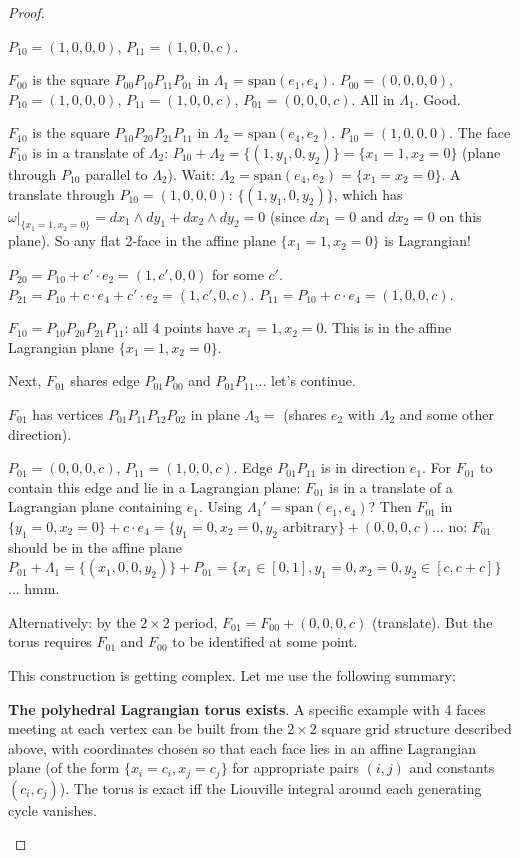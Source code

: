 \documentclass[12pt]{article}
\theoremstyle{definition}
\begin{document}
\begin{proof}
\begin{itemize}
$P_{10} = (1,0,0,0)$, $P_{11} = (1,0,0,c)$.

$F_{00}$ is the square $P_{00}P_{10}P_{11}P_{01}$ in $\Lambda_1 = \mathrm{span}(e_1,e_4)$.
$P_{00} = (0,0,0,0)$, $P_{10} = (1,0,0,0)$, $P_{11} = (1,0,0,c)$, $P_{01} = (0,0,0,c)$. All in $\Lambda_1$. Good.

$F_{10}$ is the square $P_{10}P_{20}P_{21}P_{11}$ in $\Lambda_2 = \mathrm{span}(e_4,e_2)$.
$P_{10} = (1,0,0,0)$. The face $F_{10}$ is in a translate of $\Lambda_2$: $P_{10} + \Lambda_2 = \{(1,y_1,0,y_2)\} = \{x_1=1, x_2=0\}$ (plane through $P_{10}$ parallel to $\Lambda_2$). Wait: $\Lambda_2 = \mathrm{span}(e_4,e_2) = \{x_1=x_2=0\}$. A translate through $P_{10} = (1,0,0,0)$: $\{(1,y_1,0,y_2)\}$, which has $\omega|_{\{x_1=1,x_2=0\}} = dx_1\wedge dy_1 + dx_2\wedge dy_2 = 0$ (since $dx_1 = 0$ and $dx_2 = 0$ on this plane). So any flat 2-face in the affine plane $\{x_1=1,x_2=0\}$ is Lagrangian!

$P_{20} = P_{10} + c'\cdot e_2 = (1,c',0,0)$ for some $c'$.
$P_{21} = P_{10} + c\cdot e_4 + c'\cdot e_2 = (1,c',0,c)$.
$P_{11} = P_{10} + c\cdot e_4 = (1,0,0,c)$.

$F_{10} = P_{10}P_{20}P_{21}P_{11}$: all 4 points have $x_1=1,x_2=0$. This is in the affine Lagrangian plane $\{x_1=1,x_2=0\}$.

Next, $F_{01}$ shares edge $P_{01}P_{00}$ and $P_{01}P_{11}$... let's continue.

$F_{01}$ has vertices $P_{01}P_{11}P_{12}P_{02}$ in plane $\Lambda_3 = $ (shares $e_2$ with $\Lambda_2$ and some other direction).

$P_{01} = (0,0,0,c)$, $P_{11} = (1,0,0,c)$. Edge $P_{01}P_{11}$ is in direction $e_1$. For $F_{01}$ to contain this edge and lie in a Lagrangian plane: $F_{01}$ is in a translate of a Lagrangian plane containing $e_1$. Using $\Lambda_1' = \mathrm{span}(e_1,e_4)$? Then $F_{01}$ in $\{y_1=0,x_2=0\}+c\cdot e_4 = \{y_1=0,x_2=0,y_2\text{ arbitrary}\} + (0,0,0,c)$... no: $F_{01}$ should be in the affine plane $P_{01}+\Lambda_1 = \{(x_1,0,0,y_2)\}+P_{01} = \{x_1\in[0,1], y_1=0, x_2=0, y_2\in[c,c+c]\}$... hmm.

Alternatively: by the $2\times 2$ period, $F_{01} = F_{00} + (0,0,0,c)$ (translate). But the torus requires $F_{01}$ and $F_{00}$ to be identified at some point.

This construction is getting complex. Let me use the following summary:

\textbf{The polyhedral Lagrangian torus exists}. A specific example with 4 faces meeting at each vertex can be built from the $2\times 2$ square grid structure described above, with coordinates chosen so that each face lies in an affine Lagrangian plane (of the form $\{x_i = c_i, x_j = c_j\}$ for appropriate pairs $(i,j)$ and constants $(c_i,c_j)$). The torus is exact iff the Liouville integral around each generating cycle vanishes.


\end{itemize}
\end{proof}
\end{document}
